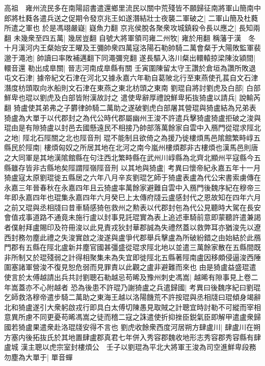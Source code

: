 高祖　雍州流民多在南陽詔書遣還鄉里流民以關中荒殘皆不願歸征南將軍山簡南中郎將杜蕤各遣兵送之促期令發京兆王如遂潛結壯士夜襲二軍破之|{
	二軍山簡及杜蕤所遣之軍也}
於是馮翊嚴嶷|{
	嶷魚力翻}
京兆侯脫各聚衆攻城鎮殺令長以應之|{
	長知兩翻}
未幾衆至四五萬|{
	幾居豈翻}
自號大將軍領司雍二州牧|{
	雍於用翻}
稱藩于漢　冬十月漢河内王粲始安王曜及王彌帥衆四萬寇洛陽石勒帥騎二萬會粲于大陽敗監軍裴邈于澠池|{
	帥讀曰率敗補邁翻下同澠彌兖翻}
遂長驅入洛川粲出轘轅掠梁陳汝潁間|{
	轘音還}
勒出成臯關|{
	晉志河南成臯縣有關}
壬寅圍陳留太守王讚於倉垣為讚所敗退屯文石津|{
	據帝紀文石津在河北又據永嘉六年勒自葛陂北行至東燕使孔萇自文石津潛度枋頭取向氷船則文石津在東燕之東北枋頭之東南}
劉琨自將討劉虎及白部|{
	白部鮮卑也琨以劉虎及白部皆附漢故討之}
遣使卑辭厚禮說鮮卑拓抜猗盧以請兵|{
	說輸芮翻}
猗盧使其弟弗之子欝律帥騎二萬助之遂破劉虎白部屠其營琨與猗盧結為兄弟表猗盧為大單于以代郡封之為代公時代郡屬幽州王浚不許遣兵擊猗盧猗盧拒破之浚與琨由是有隙猗盧以封邑去國懸遠民不相接乃帥部落萬餘家自雲中入鴈門從琨求陘北之地|{
	陘北石陘關之北也陘音刑}
琨不能制且欲倚之為援乃徙樓煩馬邑隂館繁畤崞五縣民於陘南|{
	樓煩匈奴之所居其地在北河之南今嵐州樓煩郡非古樓煩也漢馬邑則唐之大同軍是其地漢隂館縣在句注西北繁畤縣在武州川崞縣為北齊北顯州平寇縣今五縣雖存皆非古縣地矣陘謂陘嶺陘音刑}
以其地與猗盧|{
	考異曰懷帝紀永嘉五年十一月猗盧寇太原劉琨徙五縣居之六年八月辛亥劉琨乞師于猗盧表盧為代公宋書索虜傳在永嘉三年晉春秋在永嘉四年且云猗盧率萬餘家避難自雲中入鴈門後魏序紀在穆帝三年即永嘉四年也琨集永嘉四年六月癸巳上太傳府牋云盧感封代之恩故知在四年六月之前又琨與丞相牋曰昔車騎感猗㐌救州之勲表以代郡封㐌為代公見聽時大駕在長安會值戎事道路不通竟未施行盧以封事見託琨實為表上追述車騎前意即蒙聽許遣兼謁者僕射拜盧賜印及符冊浚以此見責戎狄封華郡誠為失禮然蓋以救弊耳亦猶浚先以遼西封務勿塵此禮之失浚實啟之浚遂與盧爭代郡舉兵擊盧為所破紛錯之由始結於此鴈門郡有五縣在陘北盧新并塵官國甚彊盛從琨求陘北地以並遣三萬餘家散在五縣間既非所制又於琨殘弱之計得相聚集未為失宜即徙陘北五縣著陘南盧因移頗侵逼浚西陲圍塞諸軍營浚不復見恕危弱而見罪責以此觀之盧非避難而來也}
由是猗盧益盛琨遣使言於太傅越請出兵共討劉聰石勒越忌苟晞及豫州刺史馮嵩|{
	越晞有隙事見上卷二年嵩蓋亦不心附越者}
恐為後患不許琨乃謝猗盧之兵遣歸國|{
	考異曰後魏序紀曰劉琨乞師救洛穆帝遣步騎二萬助之東海王越以洛陽饑荒不許按琨與丞相牋曰琨傾身竭辭北和猗盧遂引大衆躬啟戎行即具白太傅切陳愚見取賊之計聰宜時討勒不可縱而宰相意異所慮不同更憂苟晞馮嵩之徒而稽二寇之誅遣使折抑挫臣鋭氣臣即解甲遣盧衆歸國若猗盧果遣衆赴洛琨牋安得不言也}
劉虎收餘衆西度河居朔方肆盧川|{
	肆盧川在朔方塞内後拓抜氏於其地置肆盧郡真君七年併入秀容郡魏收地形志秀容郡秀容縣有肆盧城}
漢主聰以虎宗室封樓煩公　壬子以劉琨為平北大將軍王浚為司空進鮮卑段務勿塵為大單于|{
	單音蟬}
